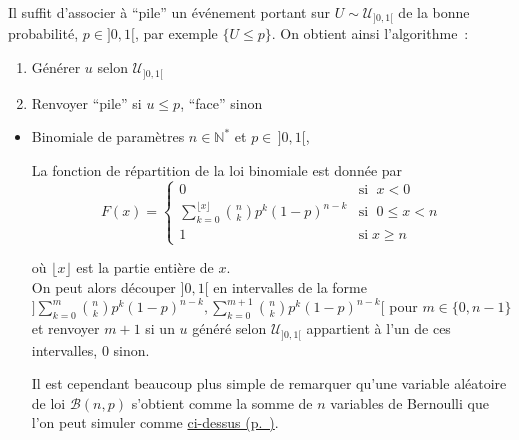 \label{V-answer-pf}
Il suffit d'associer à ``pile'' un événement portant sur
\(U \sim \mathcal{U}_{]0,1[}\) de la bonne probabilité, \(p \in ]0,1[\),
par exemple \(\{U \leq p\}\). On obtient ainsi l'algorithme~:

\begin{enumerate}
\def\labelenumi{\arabic{enumi}.}
\tightlist
\item
  Générer \(u\) selon \(\mathcal{U}_{]0,1[}\)
\item
  Renvoyer ``pile'' si \(u \leq p\), ``face'' sinon
\end{enumerate}

\label{V-answer-exemples2}

\begin{itemize}
\item
  Binomiale de paramètres \(n\in\mathbb{N}^\ast\) et \(p \in\, ]0,1[\),

  La fonction de répartition de la loi binomiale est donnée par
  \[F(x) = \begin{cases}
    0&\text{si } \;x<0\\
    \sum_{{k=0}}^{{\lfloor x\rfloor }}{n \choose k}p^{k}(1-p)^{{n-k}} & \text{si } \;0\leq x<n\\
    1&\text{si} \;x \geq n
    \end{cases}\]

  où \({\lfloor x\rfloor }\) est la partie entière de \(x\).\\
  On peut alors découper \(]0,1[\) en intervalles de la forme
  \(]\sum_{{k=0}}^{{m}}{n \choose k}p^{k}(1-p)^{{n-k}},\sum_{{k=0}}^{{m+1}}{n \choose k}p^{k}(1-p)^{{n-k}}[\)
  pour \(m \in \{0,n-1\}\) et renvoyer \(m+1\) si un \(u\) généré selon
  \(\mathcal{U}_{] 0,1[}\) appartient à l'un de ces intervalles, 0
  sinon.

  Il est cependant beaucoup plus simple de remarquer qu'une variable
  aléatoire de loi \(\mathcal{B}(n,p)\) s'obtient comme la somme de
  \(n\) variables de Bernoulli que l'on peut simuler comme
  \protect\hyperref[V-answer-pf]{ci-dessus (p.~\pageref*{V-answer-pf})}.
\end{itemize}

